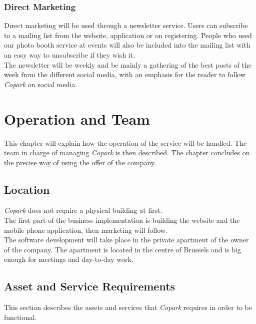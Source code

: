 \documentclass[12pt,a4paper,oneside]{book}
\newcommand{\bp}{\textit{Copark}}
\begin{document}
\subsection{Direct Marketing}

Direct marketing will be used through a newsletter service. Users can subscribe to a mailing list from the website, application or on registering. People who used our photo booth service at events will also be included into the mailing list with an easy way to unsubscribe if they wish it.\\

The newsletter will be weekly and be mainly a gathering of the best posts of the week from the different social media, with an emphasis for the reader to follow \bp{} on social media.

\chapter{Operation and Team}
\label{otch}

This chapter will explain how the operation of the service will be handled. The team in charge of managing \bp{} is then described. The chapter concludes on the precise way of using the offer of the company.\\

\section{Location}
\bp{} does not require a physical building at first.\\

The first part of the business implementation is building the website and the mobile phone application, then marketing will follow.\\

The software development will take place in the private apartment of the owner of the company. The apartment is located in the centre of Brussels and is big enough for meetings and day-to-day work.\\

\section{Asset and Service Requirements}
This section describes the assets and services that \bp{} requires in order to be functional.
\end{document}
